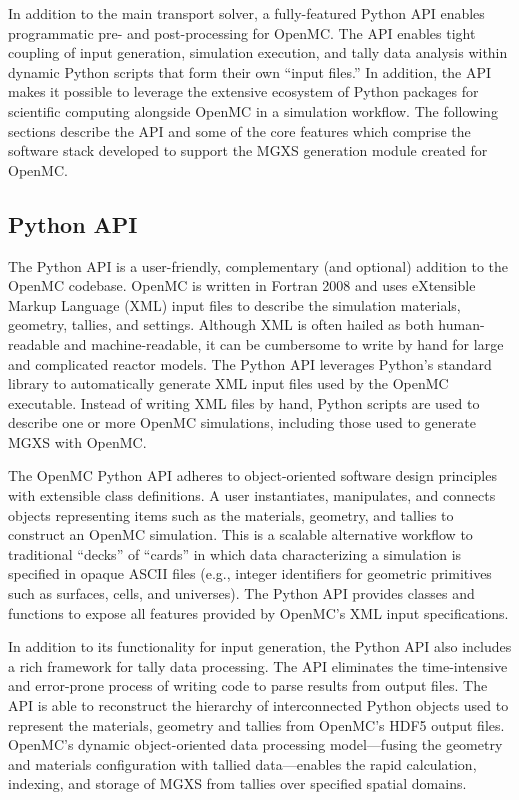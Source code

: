 In addition to the main transport solver, a fully-featured Python API enables programmatic pre- and post-processing for OpenMC\cite{boyd2016bigdata}. The API enables tight coupling of input generation, simulation execution, and tally data analysis within dynamic Python scripts that form their own ``input files.'' In addition, the API makes it possible to leverage the extensive ecosystem of Python packages for scientific computing alongside OpenMC in a simulation workflow. The following sections describe the API and some of the core features which comprise the software stack developed to support the MGXS generation module created for OpenMC.

\subsection{Python API}
\label{subsec:pyapi}

The Python API is a user-friendly, complementary (and optional) addition to the OpenMC codebase. OpenMC is written in Fortran 2008 and uses eXtensible Markup Language (XML) input files to describe the simulation materials, geometry, tallies, and settings. Although XML is often hailed as both human-readable and machine-readable, it can be cumbersome to write by hand for large and complicated reactor models. The Python API leverages Python's standard library to automatically generate XML input files used by the OpenMC executable. Instead of writing XML files by hand, Python scripts are used to describe one or more OpenMC simulations, including those used to generate MGXS with OpenMC.

The OpenMC Python API adheres to object-oriented software design principles with extensible class definitions. A user instantiates, manipulates, and connects objects representing items such as the materials, geometry, and tallies to construct an OpenMC simulation. This is a scalable alternative workflow to traditional ``decks'' of ``cards'' in which data characterizing a simulation is specified in opaque ASCII files (e.g., integer identifiers for geometric primitives such as surfaces, cells, and universes). The Python API provides classes and functions to expose all features provided by OpenMC's XML input specifications.

In addition to its functionality for input generation, the Python API also includes a rich framework for tally data processing. The API eliminates the time-intensive and error-prone process of writing code to parse results from output files. The API is able to reconstruct the hierarchy of interconnected Python objects used to represent the materials, geometry and tallies from OpenMC's HDF5 output files. OpenMC's dynamic object-oriented data processing model---fusing the geometry and materials configuration with tallied data---enables the rapid calculation, indexing, and storage of MGXS from tallies over specified spatial domains.

